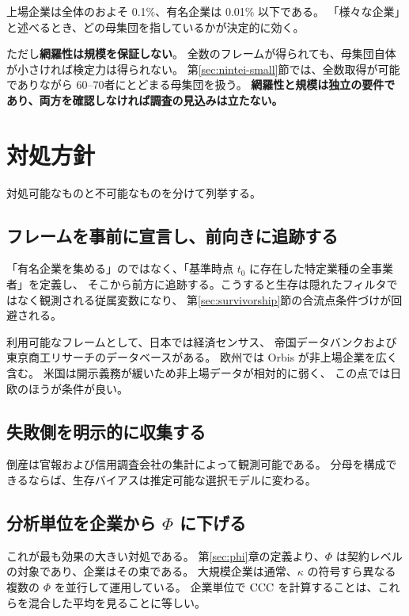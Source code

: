 上場企業は全体のおよそ 0.1\%、有名企業は 0.01\% 以下である。
「様々な企業」と述べるとき、どの母集団を指しているかが決定的に効く。

ただし\textbf{網羅性は規模を保証しない}。
全数のフレームが得られても、母集団自体が小さければ検定力は得られない。
第\ref{sec:nintei-small}節では、全数取得が可能でありながら
60--70者にとどまる母集団を扱う。
\textbf{網羅性と規模は独立の要件であり、両方を確認しなければ調査の見込みは立たない。}

\section{対処方針}

対処可能なものと不可能なものを分けて列挙する。

\subsection{フレームを事前に宣言し、前向きに追跡する}

「有名企業を集める」のではなく、「基準時点 $t_0$ に存在した特定業種の全事業者」を定義し、
そこから前方に追跡する。こうすると生存は隠れたフィルタではなく観測される従属変数になり、
第\ref{sec:survivorship}節の合流点条件づけが回避される。

利用可能なフレームとして、日本では経済センサス、
帝国データバンクおよび東京商工リサーチのデータベースがある。
欧州では Orbis が非上場企業を広く含む。
米国は開示義務が緩いため非上場データが相対的に弱く、
この点では日欧のほうが条件が良い。

\subsection{失敗側を明示的に収集する}

倒産は官報および信用調査会社の集計によって観測可能である。
分母を構成できるならば、生存バイアスは推定可能な選択モデルに変わる。

\subsection{分析単位を企業から \texorpdfstring{$\Phi$}{Φ} に下げる}
\label{sec:unit}

これが最も効果の大きい対処である。
第\ref{sec:phi}章の定義より、$\Phi$ は契約レベルの対象であり、企業はその束である。
大規模企業は通常、$\kappa$ の符号すら異なる複数の $\Phi$ を並行して運用している。
企業単位で $\mathrm{CCC}$ を計算することは、これらを混合した平均を見ることに等しい。

